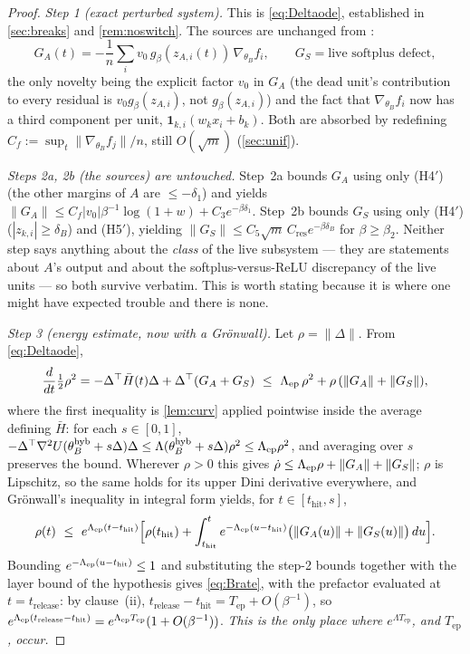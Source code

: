 \documentclass[11pt]{article}
\theoremstyle{remark}
\newcommand{\thit}{t_{\mathrm{hit}}}
\newcommand{\trel}{t_{\mathrm{release}}}
\newcommand{\Tep}{T_{\mathrm{ep}}}
\newcommand{\hyb}{\mathrm{hyb}}
\newcommand{\Cres}{C_{\mathrm{res}}}
\newcommand{\hyplabel}[1]{\textup{(#1)}}
\begin{document}
\begin{proof}
\emph{Step 1 (exact perturbed system).} This is \eqref{eq:Deltaode}, established
in \cref{sec:breaks} and \cref{rem:noswitch}. The sources are unchanged from
\cite[L2$'$]{paper}:
\[
G_A(t)=-\frac1n\sum_i v_0\,g_\beta(z_{A,i}(t))\,\nabla_{\theta_B}f_i,
\qquad G_S=\text{live softplus defect},
\]
the only novelty being the explicit factor $v_0$ in $G_A$ (the dead unit's
contribution to every residual is $v_0g_\beta(z_{A,i})$, not $g_\beta(z_{A,i})$)
and the fact that $\nabla_{\theta_B}f_i$ now has a third component per unit,
$\mathbf1_{k,i}(w_kx_i+b_k)$. Both are absorbed by redefining
$C_f:=\sup_t\|\nabla_{\theta_B}f_j\|/n$, still $O(\sqrt m)$ (\cref{sec:unif}).

\emph{Steps 2a, 2b (the sources) are untouched.} Step~2a bounds $G_A$ using only
\hyplabel{H4$'$} (the other margins of $A$ are $\le-\delta_1$) and yields
$\|G_A\|\le C_f|v_0|\beta^{-1}\log(1+w)+C_3e^{-\beta\delta_1}$. Step~2b bounds
$G_S$ using only \hyplabel{H4$'$} ($|z_{k,i}|\ge\delta_B$) and \hyplabel{H5$'$},
yielding $\|G_S\|\le C_5\sqrt m\,\Cres e^{-\beta\delta_B}$ for
$\beta\ge\beta_2$. Neither step says anything about the \emph{class} of the
live subsystem --- they are statements about $A$'s output and about the
softplus-versus-ReLU discrepancy of the live units --- so both survive verbatim.
This is worth stating because it is where one might have expected trouble and
there is none.

\emph{Step 3 (energy estimate, now with a Gr\"onwall).} Let $\rho=\|\Delta\|$.
From \eqref{eq:Deltaode},
\[
\frac{d}{dt}\tfrac12\rho^2
=-\Delta^\top\bar H(t)\Delta+\Delta^\top(G_A+G_S)
\ \le\ \Lambda_{\rm ep}\,\rho^2+\rho\,(\|G_A\|+\|G_S\|),
\]
where the first inequality is \cref{lem:curv} applied pointwise inside the
average defining $\bar H$: for each $s\in[0,1]$,
$-\Delta^\top\nabla^2U(\theta_B^{\hyb}+s\Delta)\Delta\le
\Lambda(\theta_B^{\hyb}+s\Delta)\rho^2\le\Lambda_{\rm ep}\rho^2$, and averaging
over $s$ preserves the bound. Wherever $\rho>0$ this gives
$\dot\rho\le\Lambda_{\rm ep}\rho+\|G_A\|+\|G_S\|$; $\rho$ is Lipschitz, so the
same holds for its upper Dini derivative everywhere, and Gr\"onwall's inequality
in integral form yields, for $t\in[\thit,s]$,
\begin{equation}\label{eq:gronwall}
\rho(t)\ \le\ e^{\Lambda_{\rm ep}(t-\thit)}
\Bigl[\rho(\thit)+\int_{\thit}^{t}e^{-\Lambda_{\rm ep}(u-\thit)}
\bigl(\|G_A(u)\|+\|G_S(u)\|\bigr)\,du\Bigr].
\end{equation}
Bounding $e^{-\Lambda_{\rm ep}(u-\thit)}\le1$ and substituting the step-2 bounds
together with the layer bound of the hypothesis gives \eqref{eq:Brate}, with the
prefactor evaluated at $t=\trel$: by clause~(ii),
$\trel-\thit=\Tep+O(\beta^{-1})$, so
$e^{\Lambda_{\rm ep}(\trel-\thit)}=e^{\Lambda_{\rm ep}\Tep}(1+O(\beta^{-1}))$.
\emph{This is the only place where $e^{\Lambda\Tep}$, and $\Tep$, occur.}


\end{proof}
\end{document}
